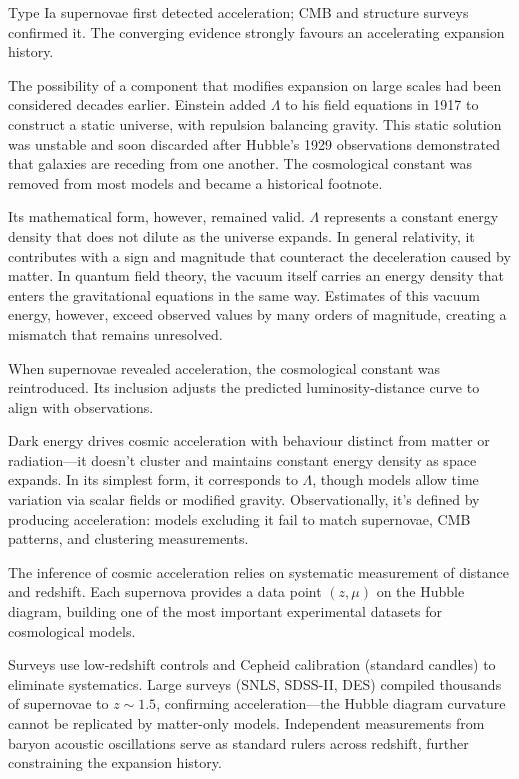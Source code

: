 Type Ia supernovae first detected acceleration; CMB and structure surveys confirmed it. The converging evidence strongly favours an accelerating expansion history.

The possibility of a component that modifies expansion on large scales had been considered decades earlier. Einstein added $\Lambda$ to his field equations in 1917 to construct a static universe, with repulsion balancing gravity. This static solution was unstable and soon discarded after Hubble's 1929 observations demonstrated that galaxies are receding from one another. The cosmological constant was removed from most models and became a historical footnote.

Its mathematical form, however, remained valid. $\Lambda$ represents a constant energy density that does not dilute as the universe expands. In general relativity, it contributes with a sign and magnitude that counteract the deceleration caused by matter. In quantum field theory, the vacuum itself carries an energy density that enters the gravitational equations in the same way. Estimates of this vacuum energy, however, exceed observed values by many orders of magnitude, creating a mismatch that remains unresolved.

When supernovae revealed acceleration, the cosmological constant was reintroduced. Its inclusion adjusts the predicted luminosity-distance curve to align with observations.

\QSOpen{}Dark energy\QSClose{} drives cosmic acceleration with behaviour distinct from matter or radiation—it doesn't cluster and maintains constant energy density as space expands. In its simplest form, it corresponds to $\Lambda$, though models allow time variation via scalar fields or modified gravity. Observationally, it's defined by producing acceleration: models excluding it fail to match supernovae, CMB patterns, and clustering measurements.

The inference of cosmic acceleration relies on systematic measurement of distance and redshift. Each supernova provides a data point $(z, \mu)$ on the Hubble diagram, building one of the most important experimental datasets for cosmological models.

Surveys use low-redshift controls and Cepheid calibration (standard candles) to eliminate systematics. Large surveys (SNLS, SDSS-II, DES) compiled thousands of supernovae to $z \sim 1.5$, confirming acceleration—the Hubble diagram curvature cannot be replicated by matter-only models. Independent measurements from baryon acoustic oscillations serve as standard rulers across redshift, further constraining the expansion history.

